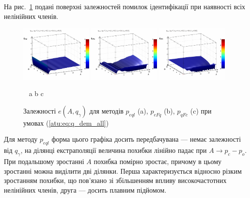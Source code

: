 На рис.~\ref{atu:f:qsl_pe_A_qg_all} подані поверхні залежностей помилок ідентифікації
при наявності всіх нелінійних членів.


\begin{figure}[htb!]
  \begin{center}
    \includegraphics[width=0.32\textwidth]{p/qls_pe-p_A_qg_eql_all.png}
    \hfill
    \includegraphics[width=0.32\textwidth]{p/qls_pe-p_A_qg_eFq_all.png}
    \hfill
    \includegraphics[width=0.32\textwidth]{p/qls_pe-p_A_qg_eFc_all.png}
  \end{center}
  \vspace{-1.5ex}
  \begin{center}
    ~ \hfill a \hfill\hfill b \hfill\hfill c \hfill ~
  \end{center}
  \vspace{-2.5ex}
  \caption{Залежності $e(A,q_\gamma)$ для методів $p_{eql}$ (a), $p_{eFq}$ (b), $p_{qFc}$ (c) при умовах (\ref{atu:eq:q_dem_all})}
  \label{atu:f:qsl_pe_A_qg_all}
\end{figure}

Для методу $p_{eql}$ форма цього графіка досить передбачувана --- немає
залежності від $q_\gamma$, на ділянці екстраполяції величина похибки
лінійно падає при $A \to p_c - p_o$. При подальшому зростанні $A$ похибка
помірно зростає, причому в цьому зростанні можна виділити дві ділянки. Перша
характеризується відносно різким зростанням похибки, що пов'язано зі збільшенням
впливу високочастотних нелінійних членів, друга --- досить плавним підйомом.

